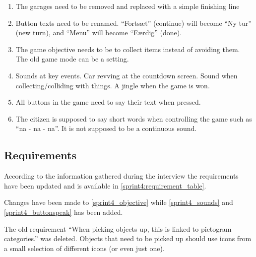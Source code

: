 \begin{enumerate}
\item The garages need to be removed and replaced with a simple finishing line
\item Button texts need to be renamed. ``Fortsæt'' (continue) will become ``Ny tur'' (new turn), and ``Menu'' will become ``Færdig'' (done).
\item The game objective needs to be to collect items instead of avoiding them. The old game mode can be a setting.
\item Sounds at key events. Car revving at the countdown screen. Sound when collecting/colliding with things.
A jingle when the game is won.
\item All buttons in the game need to say their text when pressed.
\item The citizen is supposed to say short words when controlling the game such as ``na - na - na''. It is not supposed to be a continuous sound.
\end{enumerate}

\subsection{Requirements}\label{sprint4_req}
According to the information gathered during the interview the requirements have been updated and is available in \cref{sprint4:requirement_table}.

Changes have been made to \cref{sprint4_objective} while \cref{sprint4_sounds} and \cref{sprint4_buttonspeak} has been added.

The old requirement ``When picking objects up, this is linked to pictogram categories.'' was deleted. 
Objects that need to be picked up should use icons from a small selection of different icons (or even just one).

